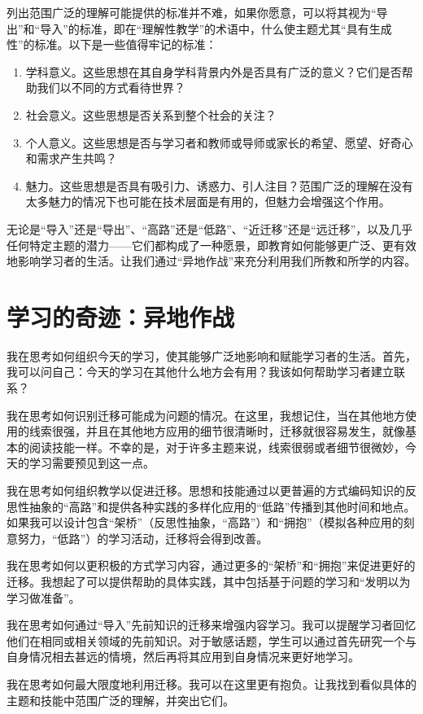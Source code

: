 列出范围广泛的理解可能提供的标准并不难，如果你愿意，可以将其视为“导出”和“导入”的标准，即在“理解性教学”的术语中，什么使主题尤其“具有生成性”的标准。以下是一些值得牢记的标准：
\begin{enumerate}
    \item 学科意义。这些思想在其自身学科背景内外是否具有广泛的意义？它们是否帮助我们以不同的方式看待世界？
    \item 社会意义。这些思想是否关系到整个社会的关注？
    \item 个人意义。这些思想是否与学习者和教师或导师或家长的希望、愿望、好奇心和需求产生共鸣？
    \item 魅力。这些思想是否具有吸引力、诱惑力、引人注目？范围广泛的理解在没有太多魅力的情况下也可能在技术层面是有用的，但魅力会增强这个作用。
\end{enumerate}

无论是“导入”还是“导出”、“高路”还是“低路”、“近迁移”还是“远迁移”，以及几乎任何特定主题的潜力——它们都构成了一种愿景，即教育如何能够更广泛、更有效地影响学习者的生活。让我们通过“异地作战”来充分利用我们所教和所学的内容。

\section*{学习的奇迹：异地作战}

我在思考如何组织今天的学习，使其能够广泛地影响和赋能学习者的生活。首先，我可以问自己：今天的学习在其他什么地方会有用？我该如何帮助学习者建立联系？

我在思考如何识别迁移可能成为问题的情况。在这里，我想记住，当在其他地方使用的线索很强，并且在其他地方应用的细节很清晰时，迁移就很容易发生，就像基本的阅读技能一样。不幸的是，对于许多主题来说，线索很弱或者细节很微妙，今天的学习需要预见到这一点。

我在思考如何组织教学以促进迁移。思想和技能通过以更普遍的方式编码知识的反思性抽象的“高路”和提供各种实践的多样化应用的“低路”传播到其他时间和地点。如果我可以设计包含“架桥”（反思性抽象，“高路”）和“拥抱”（模拟各种应用的刻意努力，“低路”）的学习活动，迁移将会得到改善。

我在思考如何以更积极的方式学习内容，通过更多的“架桥”和“拥抱”来促进更好的迁移。我想起了可以提供帮助的具体实践，其中包括基于问题的学习和“发明以为学习做准备”。

我在思考如何通过“导入”先前知识的迁移来增强内容学习。我可以提醒学习者回忆他们在相同或相关领域的先前知识。对于敏感话题，学生可以通过首先研究一个与自身情况相去甚远的情境，然后再将其应用到自身情况来更好地学习。

我在思考如何最大限度地利用迁移。我可以在这里更有抱负。让我找到看似具体的主题和技能中范围广泛的理解，并突出它们。

